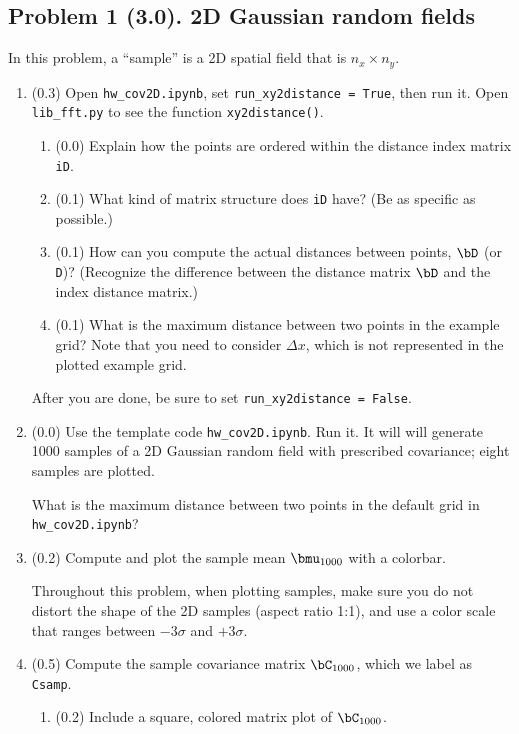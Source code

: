 \documentclass[11pt,titlepage,fleqn]{article}
\newcommand{\tfile}{{\tt hw\_cov2D.ipynb}}
\begin{document}

\pagebreak
\subsection*{Problem 1 (3.0). 2D Gaussian random fields}

In this problem, a ``sample'' is a 2D spatial field that is $n_x \times n_y$.
%
\begin{enumerate}
\item (0.3) Open \tfile, set \verb+run_xy2distance = True+, then run it. Open \verb+lib_fft.py+ to see the function \verb+xy2distance()+.
%
\begin{enumerate}
\item (0.0) Explain how the points are ordered within the distance index matrix \verb+iD+.
\item (0.1) What kind of matrix structure does \verb+iD+ have? (Be as specific as possible.)
\item (0.1) How can you compute the actual distances between points, $\bD$ (or \verb+D+)? 
(Recognize the difference between the distance matrix $\bD$ and the index distance matrix.)
\item (0.1) What is the maximum distance between two points in the example grid?
Note that you need to consider $\Delta x$, which is not represented in the plotted example grid.
\end{enumerate}
%
After you are done, be sure to set \verb+run_xy2distance = False+.

\item (0.0) Use the template code \tfile. Run it. It will will generate 1000 samples of a 2D Gaussian random field with prescribed covariance; eight samples are plotted.

What is the maximum distance between two points in the default grid in \tfile?

\item (0.2) Compute and plot the sample mean $\bmu_{1000}$ with a colorbar.

Throughout this problem, when plotting samples, make sure you do not distort the shape of the 2D samples (\ie aspect ratio 1:1), and use a color scale that ranges between $-3\sigma$ and $+3\sigma$.

\item (0.5) Compute the sample covariance matrix $\bC_{1000}$, which we label as \verb+Csamp+.

\begin{enumerate}
\item (0.2) Include a square, colored matrix plot of $\bC_{1000}$.


\end{enumerate}
\end{enumerate}
\end{document}
